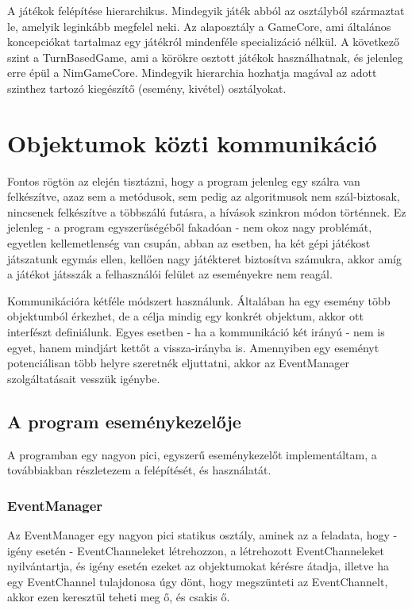 A játékok felépítése hierarchikus. Mindegyik játék abból az osztályból származtat le, amelyik leginkább megfelel neki. Az alaposztály a GameCore, ami általános koncepciókat tartalmaz egy játékról mindenféle specializáció nélkül. A következő szint a TurnBasedGame, ami a körökre osztott játékok használhatnak, és jelenleg erre épül a NimGameCore. Mindegyik hierarchia hozhatja magával az adott szinthez tartozó kiegészítő (esemény, kivétel) osztályokat.

\section{Objektumok közti kommunikáció}
Fontos rögtön az elején tisztázni, hogy a program jelenleg egy szálra van felkészítve, azaz sem a metódusok, sem pedig az algoritmusok nem szál-biztosak, nincsenek felkészítve a többszálú futásra, a hívások szinkron módon történnek. Ez jelenleg - a program egyszerűségéből fakadóan - nem okoz nagy problémát, egyetlen kellemetlenség van csupán, abban az esetben, ha két gépi játékost játszatunk egymás ellen, kellően nagy játékteret biztosítva számukra, akkor amíg a játékot játsszák a felhasználói felület az eseményekre nem reagál.\ujsor

Kommunikációra kétféle módszert használunk. Általában ha egy esemény több objektumból érkezhet, de a célja mindig egy konkrét objektum, akkor ott interfészt definiálunk. Egyes esetben - ha a kommunikáció két irányú - nem is egyet, hanem mindjárt kettőt a vissza-irányba is. Amennyiben egy eseményt potenciálisan több helyre szeretnék eljuttatni, akkor az EventManager szolgáltatásait vesszük igénybe.

\subsection{A program eseménykezelője}
A programban egy nagyon pici, egyszerű eseménykezelőt implementáltam, a továbbiakban részletezem a felépítését, és használatát.

\subsubsection{EventManager}
Az EventManager egy nagyon pici statikus osztály, aminek az a feladata, hogy - igény esetén - EventChanneleket létrehozzon, a létrehozott EventChanneleket nyilvántartja, és igény esetén ezeket az objektumokat kérésre átadja, illetve ha egy EventChannel tulajdonosa úgy dönt, hogy megszünteti az EventChannelt, akkor ezen keresztül teheti meg ő, és csakis ő.

